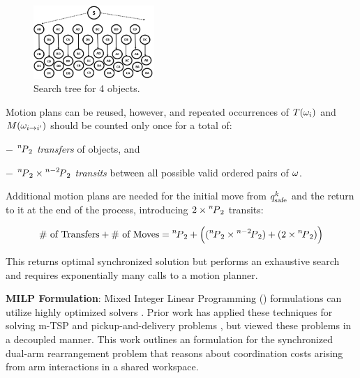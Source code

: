 \begin{figure}
    \vspace{-.5in}
	\centering
	\includegraphics[width=1.8in]{figures/dual_backtracking.PNG}
    \vspace{-.15in}
	\caption{Search tree for 4 objects. 
	}
	\label{fig:backtracking}
    \vspace{-.3in}
\end{figure}
Motion plans can be reused, however, and repeated occurrences of $T(\coma_i)$ and $M(\coma_{i\rightarrow i^{\prime}})$ should be counted only once for a total of: 
\begin{myitem}
\item[$-$] $  {\permu[n]{2}} $ \textit{transfers} of objects, and 
\item[$-$] $ {{\permu[n]{2}}\times\permu[n-2]{2}} $ \textit{transits} between all possible valid ordered pairs of $ \coma $.
\end{myitem}
Additional motion plans are needed for the initial move from $q_{\rm safe}^k$ and the return to it at the end of the process, introducing $ 2\times\permu[n]{2} $ transits:

\vspace{-0.25in}
\begin{equation}
\textrm{\# of Transfers} + \textrm{\# of Moves} =  {\permu[n]{2}} +   \Big{(}({{\permu[n]{2}}\times\permu[n-2]{2}}) + (2\times{\permu[n]{2}})\Big{)}
\label{eq:mpcount}
\vspace{-0.15in}
\end{equation}

This returns optimal synchronized solution but performs an exhaustive search and requires exponentially many calls to a motion planner.

\noindent\textbf{MILP Formulation}:
Mixed Integer Linear Programming (\milp) formulations can utilize highly optimized solvers \cite{gurobi}. Prior work has applied these techniques for solving m-TSP \cite{rathinam2006matroid,friggstad2013multiple} and pickup-and-delivery problems \cite{coltin2014multi,savelsbergh1995general}, but viewed these problems in a decoupled manner. This work outlines an \milp formulation for the synchronized dual-arm rearrangement problem that reasons about coordination costs arising from arm interactions in a shared workspace.

